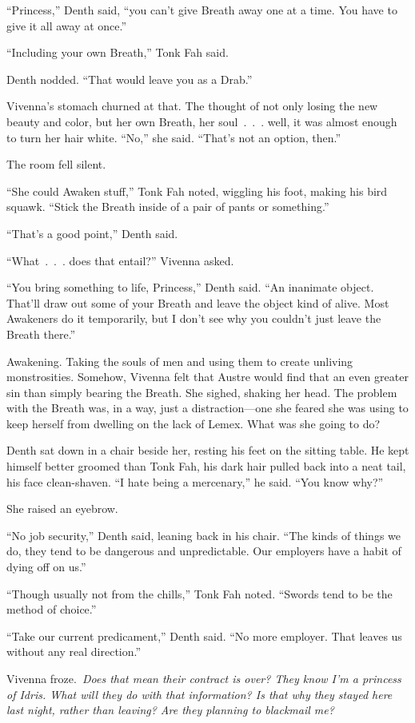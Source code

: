 “Princess,” Denth said, “you can’t give Breath away one at a time. You have to give it all away at once.”

“Including your own Breath,” Tonk Fah said.

Denth nodded. “That would leave you as a Drab.”

Vivenna’s stomach churned at that. The thought of not only losing the new beauty and color, but her own Breath, her soul~.~.~. well, it was almost enough to turn her hair white. “No,” she said. “That’s not an option, then.”

The room fell silent.

“She could Awaken stuff,” Tonk Fah noted, wiggling his foot, making his bird squawk. “Stick the Breath inside of a pair of pants or something.”

“That’s a good point,” Denth said.

“What~.~.~. does that entail?” Vivenna asked.

“You bring something to life, Princess,” Denth said. “An inanimate object. That’ll draw out some of your Breath and leave the object kind of alive. Most Awakeners do it temporarily, but I don’t see why you couldn’t just leave the Breath there.”

Awakening. Taking the souls of men and using them to create unliving monstrosities. Somehow, Vivenna felt that Austre would find that an even greater sin than simply bearing the Breath. She sighed, shaking her head. The problem with the Breath was, in a way, just a distraction—one she feared she was using to keep herself from dwelling on the lack of Lemex. What was she going to do?

Denth sat down in a chair beside her, resting his feet on the sitting table. He kept himself better groomed than Tonk Fah, his dark hair pulled back into a neat tail, his face clean-shaven. “I hate being a mercenary,” he said. “You know why?”

She raised an eyebrow.

“No job security,” Denth said, leaning back in his chair. “The kinds of things we do, they tend to be dangerous and unpredictable. Our employers have a habit of dying off on us.”

“Though usually not from the chills,” Tonk Fah noted. “Swords tend to be the method of choice.”

“Take our current predicament,” Denth said. “No more employer. That leaves us without any real direction.”

Vivenna froze.~\textit{Does that mean their contract is over? They know I’m a princess of Idris. What will they do with that information? Is that why they stayed here last night, rather than leaving? Are they planning to blackmail me?}

